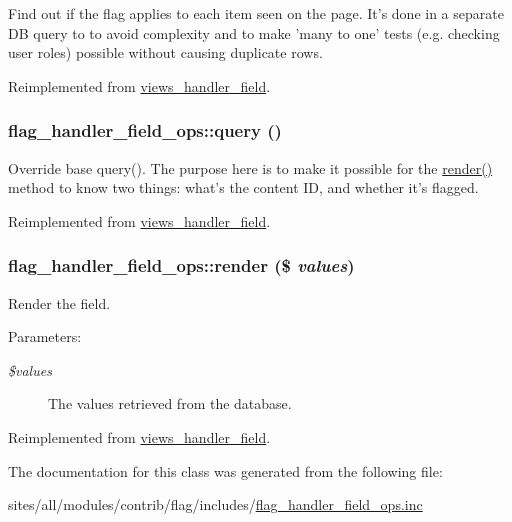 Find out if the flag applies to each item seen on the page. It's done in a separate DB query to to avoid complexity and to make 'many to one' tests (e.g. checking user roles) possible without causing duplicate rows. 

Reimplemented from \hyperlink{classviews__handler__field_e30a1d9c98c62ae40c90b938e09cd0ec}{views\_\-handler\_\-field}.\hypertarget{classflag__handler__field__ops_a42722b03427da1e009f3b6075af703a}{
\subsubsection[{query}]{\setlength{\rightskip}{0pt plus 5cm}flag\_\-handler\_\-field\_\-ops::query ()}}
\label{classflag__handler__field__ops_a42722b03427da1e009f3b6075af703a}


Override base query(). The purpose here is to make it possible for the \hyperlink{classflag__handler__field__ops_3732dd37e3011699c7489e02e2aa3655}{render()} method to know two things: what's the content ID, and whether it's flagged. 

Reimplemented from \hyperlink{classviews__handler__field_4f661f91bcbe80d4a00c30a31456c502}{views\_\-handler\_\-field}.\hypertarget{classflag__handler__field__ops_3732dd37e3011699c7489e02e2aa3655}{
\subsubsection[{render}]{\setlength{\rightskip}{0pt plus 5cm}flag\_\-handler\_\-field\_\-ops::render (\$ {\em values})}}
\label{classflag__handler__field__ops_3732dd37e3011699c7489e02e2aa3655}


Render the field.

\begin{Desc}
\item[Parameters:]
\begin{description}
\item[{\em \$values}]The values retrieved from the database. \end{description}
\end{Desc}


Reimplemented from \hyperlink{classviews__handler__field_82ff951c5e9ceb97b2eab86f880cbc1e}{views\_\-handler\_\-field}.

The documentation for this class was generated from the following file:\begin{CompactItemize}
\item 
sites/all/modules/contrib/flag/includes/\hyperlink{flag__handler__field__ops_8inc}{flag\_\-handler\_\-field\_\-ops.inc}\end{CompactItemize}
